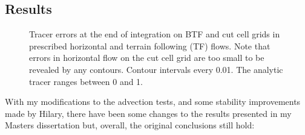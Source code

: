 \documentclass[a4paper]{article}
\begin{document}
\subsection{Results}
\begin{figure}
	\centering
	
%
	\caption{Tracer errors at the end of integration on BTF and cut cell grids in prescribed horizontal and terrain following (TF) flows.  Note that errors in horizontal flow on the cut cell grid are too small to be revealed by any contours.  Contour intervals every 0.01.  The analytic tracer ranges between 0 and 1.}
	\label{fig:advection-results}
\end{figure}

With my modifications to the advection tests, and some stability improvements made by Hilary, there have been some changes to the results presented in my Masters dissertation but, overall, the original conclusions still hold:
\end{document}
